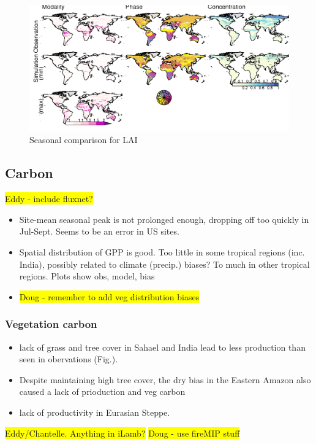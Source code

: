 \documentclass[bg, manuscript]{copernicus}
\newcommand{\hilight}[1]{\colorbox{yellow}{#1}}
\begin{document}
\begin{figure}[t]
    \includegraphics[width=12cm]{figs/LAI/fire_var_seasonality-maps-MPCcontrol-lai.png}
    \caption{Seasonal comparison for LAI \label{fig:LAIseasonalMap}}
\end{figure}

\subsection{Carbon}
\hilight{Eddy - include fluxnet?}

\begin{itemize}
    \item Site-mean seasonal peak is not prolonged enough, dropping off too quickly in Jul-Sept. Seems to be an error in US sites.
    \item Spatial distribution of GPP is good. Too little in some tropical regions (inc. India), possibly related to climate (precip.) biases? To much in other tropical regions. Plots show obs, model, bias
    \item \hilight{Doug - remember to add veg distribution biases}
\end{itemize}

\subsubsection{Vegetation carbon}

\begin{itemize}
    \item lack of grass and tree cover in Sahael and India lead to less production than seen in obervations (Fig.). 
    \item Despite maintaining high tree cover, the dry bias in the Eastern Amazon also caused a lack of prioduction and veg carbon
    \item lack of productivity in Eurasian Steppe.
\end{itemize}
\hilight{Eddy/Chantelle. Anything in iLamb?}
\hilight{Doug - use fireMIP stuff}
\end{document}
